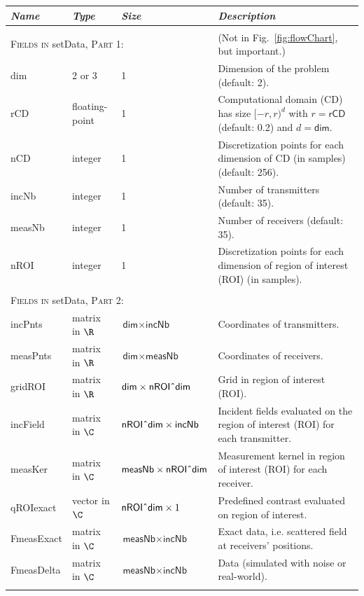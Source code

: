 \documentclass[a4paper]{article}
\begin{document}
\begin{table}
\begin{tabular}{p{1.8cm} p{2.1cm} p{3cm} p{7.9cm}}
\hline
\emph{Name} & \emph{Type} & \emph{Size} & \emph{Description}\\
\hline
\\

\multicolumn{3}{l}{\textsc{Fields in} \textsf{setData}, \textsc{Part 1}:} & (Not in Fig.~\ref{fig:flowChart}, but important.)\\
\hline
\textsf{dim} & 2 or 3 & 1 & Dimension of the problem (default: 2).\\
\textsf{rCD} & floating-point & 1 & Computational domain (CD) has size $[-r,r)^d$ with $r = \textsf{rCD}$ (default: 0.2) and $d = \textsf{dim}$.\\
\textsf{nCD} & integer & 1 & Discretization points for each dimension of CD (in samples) (default: 256).\\
\textsf{incNb} & integer & 1 & Number of transmitters (default: 35).\\
\textsf{measNb} & integer & 1 & Number of receivers (default: 35).\\
\textsf{nROI} & integer & 1 & Discretization points for each dimension of region of interest (ROI) (in samples).\\
\\

\multicolumn{3}{l}{\textsc{Fields in} \textsf{setData}, \textsc{Part 2}:}\\
\hline
\textsf{incPnts} & matrix in $\R$ & $\textsf{dim} \times \textsf{incNb}$ & Coordinates of transmitters.\\
\textsf{measPnts} & matrix in $\R$ & $\textsf{dim} \times \textsf{measNb}$ & Coordinates of receivers.\\
\textsf{gridROI} & matrix in $\R$ & $\textsf{dim} \times \textsf{nROI}\textsf{\^{}}\textsf{dim}$ & Grid in region of interest (ROI).\\
\textsf{incField} & matrix in $\C$& $\textsf{nROI}\textsf{\^{}}\textsf{dim} \times \textsf{incNb}$ & Incident fields evaluated on the region of interest (ROI) for each transmitter.\\
\textsf{measKer} & matrix in $\C$& $\textsf{measNb} \times \textsf{nROI}\textsf{\^{}}\textsf{dim}$ & Measurement kernel in region of interest (ROI) for each receiver.\\
\textsf{qROIexact} & vector in $\C$& $\textsf{nROI}\textsf{\^{}}\textsf{dim} \times 1$ & Predefined contrast evaluated on region of interest.\\
\textsf{FmeasExact} & matrix in $\C$& $\textsf{measNb} \times \textsf{incNb}$ & Exact data, i.e. scattered field at receivers' positions.\\
\textsf{FmeasDelta} & matrix in $\C$& $\textsf{measNb} \times \textsf{incNb}$ & Data (simulated with noise or real-world).\\
\\


\end{tabular}
\end{table}
\end{document}
